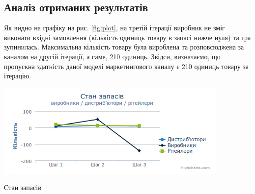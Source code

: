 \subsection{Аналіз отриманих результатів}

Як видно на графіку на рис. \ref{fig:plot}, на третій ітерації виробник не зміг виконати вхідні замовлення (кількість одиниць товару в запасі нижче нуля) та гра зупинилась. Максимальна кількість товару була вироблена та розповсюджена за каналом на другій ітерації, а саме, 210 одиниць. Звідси, визначаємо, що пропускна здатність даної моделі маркетингового каналу є 210 одиниць товару за ітерацію. 

\begin{stdfigure}
    \includegraphics[width=4.5in]{images/plot.png}
    \caption{Стан запасів}
    \label{fig:plot}
\end{stdfigure}

